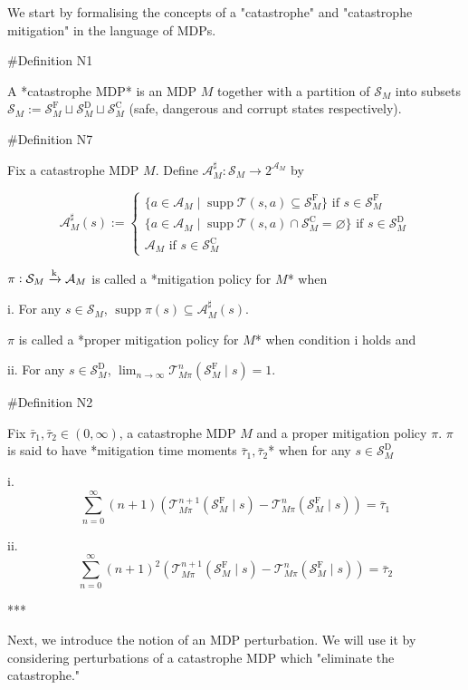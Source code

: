 \documentclass[a4paper]{article}
\newcommand{\Comment}[1]{}
\DeclareMathOperator{\Supp}{supp}
\newcommand{\AP}[1]{\left(#1\right)}
\newcommand{\Nats}{\mathbb{N}}
\newcommand{\M}{\xrightarrow{\textnormal{k}}}
\newcommand{\A}{\mathcal{A}}
\newcommand{\St}{\mathcal{S}}
\newcommand{\T}{\mathcal{T}}
\newcommand{\RMC}{\mathrm{C}}
\newcommand{\RMD}{\mathrm{D}}
\newcommand{\RMF}{\mathrm{F}}
\newcommand{\SF}{\St^{\RMF}}
\newcommand{\SD}{\St^{\RMD}}
\newcommand{\SC}{\St^{\RMC}}
\begin{document}
We start by formalising the concepts of a "catastrophe" and "catastrophe mitigation" in the language of MDPs.

\#Definition N1

A *catastrophe MDP* is an MDP $M$ together with a partition of $\St_M$ into subsets $\St_M:=\SF_M \sqcup \SD_M \sqcup \SC_M$ (safe, dangerous and corrupt states respectively).

\#Definition N7

Fix a catastrophe MDP $M$. Define $\A_M^\sharp: \St_M \rightarrow 2^{\A_M}$ by

$$\A_M^\sharp(s):=\begin{cases} \{a \in \A_M \mid \Supp{\T(s,a)} \subseteq \SF_M\} \text{ if } s \in \SF_M \\ \{a \in \A_M \mid \Supp{\T(s,a)} \cap \SC_M = \varnothing\} \text{ if } s \in \SD_M \\ \A_M \text{ if } s \in \SC_M \end{cases}$$

$\pi: \St_M \M \A_M$ is called a *mitigation policy for $M$* when 

i. For any $s \in \St_M$, $\Supp{\pi(s)} \subseteq \A_M^\sharp(s)$. 

$\pi$ is called a *proper mitigation policy for $M$* when condition i holds and

ii. For any $s \in \SD_M$, $\lim_{n \rightarrow \infty} \T_{M\pi}^n\AP{\SF_M \mid s} = 1$. 

\Comment{Given $k \in \Nats$, $\pi$ is called a *proper k-mitigation policy for $M$* when conditions i+ii hold and

iii. For any $s \in \St_D$, $\Supp{\pi(s)} \subseteq \A_M^k(s)$.

iv. For any $s \in \St_F$, $\Supp{\pi(s)} \subseteq \A_M^{k+1}(s)$.}

\#Definition N2

Fix $\bar{\tau}_1,\bar{\tau}_2 \in (0,\infty)$, a catastrophe MDP $M$ and a proper mitigation policy $\pi$. $\pi$ is said to have *mitigation time moments $\bar{\tau}_1,\bar{\tau}_2$* when for any $s \in \SD_M$

i. $$\sum_{n=0}^\infty (n+1) \AP{\T_{M\pi}^{n+1}\AP{\SF_M \mid s}-\T_{M\pi}^{n}\AP{\SF_M \mid s}} = \bar{\tau}_1$$

ii. $$\sum_{n=0}^\infty (n+1)^2 \AP{\T_{M\pi}^{n+1}\AP{\SF_M \mid s}-\T_{M\pi}^{n}\AP{\SF_M \mid s}} = \bar{\tau}_2$$

***

Next, we introduce the notion of an MDP perturbation. We will use it by considering perturbations of a catastrophe MDP which "eliminate the catastrophe."
\end{document}
